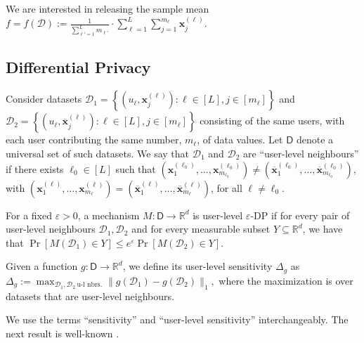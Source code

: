 We are interested in releasing the sample mean
$
	\label{eq:f}
f = f(\mathcal{D}):= \frac{1}{\sum_{\ell'=1}^L m_{\ell'}}\cdot \sum_{\ell=1}^L \sum_{j=1}^{m_\ell} \mathbf{x}_j^{(\ell)}.
$




\subsection{Differential Privacy}
\label{sec:dp}
Consider datasets $\mathcal{D}_1 = \left\{\left(u_{\ell},\mathbf{x}_j^{(\ell)}\right): \ell \in [L], j\in [m_\ell]\right\}$ and $\mathcal{D}_2 = \left\{\left(u_\ell,\overline{\mathbf{x}}_j^{(\ell)}\right): \ell \in [L], j\in [m_\ell]\right\}$ consisting of the same users, with each user contributing the same number, $m_\ell$, of  data values. Let $\mathsf{D}$ denote a universal set of such datasets. We say that $\mathcal{D}_1$ and $\mathcal{D}_2$ are ``user-level neighbours'' if there exists $\ell_0\in [L]$ such that $\left(\mathbf{x}^{(\ell_0)}_{1},\ldots, \mathbf{x}^{(\ell_0)}_{m_{\ell_0}}\right)\neq \left(\overline{\mathbf{x}}^{(\ell_0)}_{1},\ldots, \overline{\mathbf{x}}^{(\ell_0)}_{m_{\ell_0}}\right)$, with $\left(\mathbf{x}^{(\ell)}_{1},\ldots, \mathbf{x}^{(\ell)}_{m_{\ell}}\right)= \left(\overline{\mathbf{x}}^{(\ell)}_{1},\ldots, \overline{\mathbf{x}}^{(\ell)}_{m_{\ell}}\right)$, for all $\ell\neq \ell_0$. 

\begin{definition}
	For a fixed $\varepsilon>0$, a mechanism $M: \mathsf{D}\to \mathbb{R}^d$ is  user-level $\varepsilon$-DP if for every pair of user-level neighbours $\mathcal{D}_1, \mathcal{D}_2$ and for every measurable subset $Y \subseteq \mathbb{R}^d$, we have that
	$
	\Pr[M(\mathcal{D}_1) \in Y] \leq e^\varepsilon \Pr[M(\mathcal{D}_2) \in Y].
	$
\end{definition}
\begin{definition}
	Given a function $g: \mathsf{D}\to \mathbb{R}^d$, we define its user-level sensitivity $\Delta_g$ as
	$
	\Delta_g:= \max_{\mathcal{D}_1,\mathcal{D}_2\ \text{u-l nbrs.}} \lVert g(\mathcal{D}_1) - g(\mathcal{D}_2)\rVert_1,
	$
	where the maximization is over datasets that are user-level neighbours.
\end{definition}
We use the terms ``sensitivity'' and ``user-level sensitivity'' interchangeably. The next result is well-known \cite[Prop. 1]{dwork06}.

